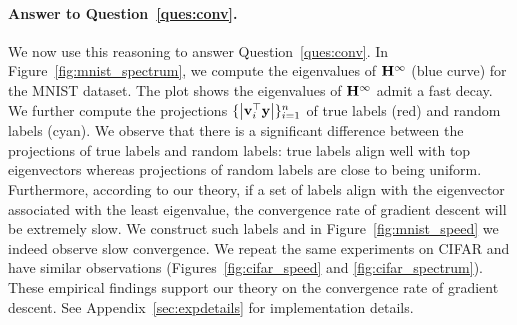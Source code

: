 \paragraph{Answer to Question~\ref{ques:conv}.}
We now use this reasoning to answer Question~\ref{ques:conv}.
In Figure~\ref{fig:mnist_spectrum}, we compute the eigenvalues of $\mathbf{H}^\infty$ (blue curve) for the MNIST dataset.
The plot shows the eigenvalues of $\mathbf{H}^\infty$ admit a fast decay.
We further compute the projections $\{\left|\mathbf{v}_i^\top \mathbf{y}\right|\}_{i=1}^n$ of true labels (red) and random labels (cyan).
We observe that there is a significant difference between the projections of true labels and random labels:
true labels align well with top eigenvectors whereas projections of random labels are close to being uniform.
Furthermore, according to our theory, if a set of labels align with the eigenvector associated with the least eigenvalue, the convergence rate of gradient descent will be extremely slow.
We construct such labels and in Figure~\ref{fig:mnist_speed} we indeed observe slow convergence.
%
We repeat the same experiments on CIFAR and have similar observations (Figures~\ref{fig:cifar_speed} and \ref{fig:cifar_spectrum}).
These empirical findings support our theory on the convergence rate of gradient descent.
See Appendix~\ref{sec:expdetails} for implementation details.

